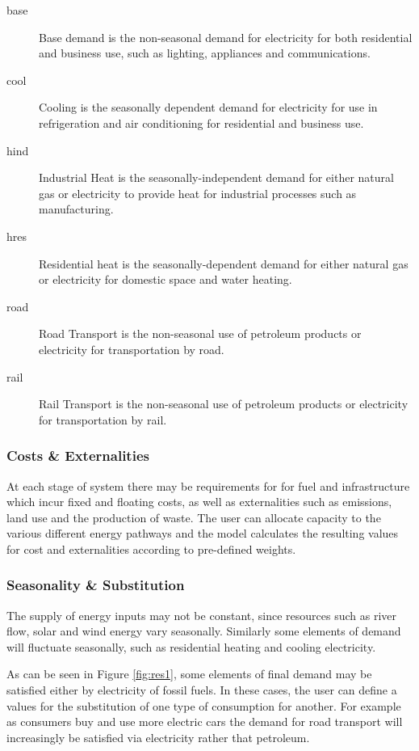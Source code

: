 \documentclass[notitlepage,a4paper]{article}
\begin{document}
\begin{description}
\item[base] Base demand is the non-seasonal demand for electricity for both residential and business use, such as lighting, appliances and communications.
\item[cool] Cooling is the seasonally dependent demand for electricity for use in refrigeration and air conditioning for residential and business use.
\item[hind] Industrial Heat is the seasonally-independent demand for either natural gas or electricity to provide heat for industrial processes such as manufacturing.
\item[hres] Residential heat is the seasonally-dependent demand for either natural gas or electricity for domestic space and water heating.  
\item[road] Road Transport is the non-seasonal use of petroleum products or electricity for transportation by road.
\item[rail] Rail Transport is the non-seasonal use of petroleum products or electricity for transportation by rail.
\end{description}


\subsubsection{Costs \& Externalities}

At each stage of system there may be requirements for for fuel and infrastructure which incur fixed and floating costs, as well as externalities such as emissions, land use and the production of waste. The user can allocate capacity to the various different energy pathways and the model calculates the resulting values for cost and externalities according to pre-defined weights.

\subsubsection{Seasonality \& Substitution}

The supply of energy inputs may not be constant, since resources such as river flow, solar and wind energy vary seasonally. Similarly some elements of demand will fluctuate seasonally, such as residential heating and cooling electricity. 

As can be seen in Figure \ref{fig:res1}, some elements of final demand may be satisfied either by electricity of fossil fuels.  In these cases, the user can define a values for the substitution of one type of consumption for another.  For example as consumers buy and use more electric cars the demand for road transport will increasingly be satisfied via electricity rather that petroleum.
\end{document}
